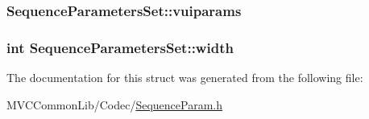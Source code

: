 \label{struct_sequence_parameters_set_a557345c281f445eb71cbcd5d72a9aed0}
\hypertarget{struct_sequence_parameters_set_ac473de5b97f08fefdbe39fe9c2c2c846}{
\subsubsection[{vuiparams}]{ {\bf SequenceParametersSet::vuiparams}}}
\label{struct_sequence_parameters_set_ac473de5b97f08fefdbe39fe9c2c2c846}
\hypertarget{struct_sequence_parameters_set_a72286e512a40a01670e2519b3971cee2}{
\subsubsection[{width}]{\setlength{\rightskip}{0pt plus 5cm}int {\bf SequenceParametersSet::width}}}
\label{struct_sequence_parameters_set_a72286e512a40a01670e2519b3971cee2}


The documentation for this struct was generated from the following file:\begin{DoxyCompactItemize}
\item 
MVCCommonLib/Codec/\hyperlink{_sequence_param_8h}{SequenceParam.h}\end{DoxyCompactItemize}
